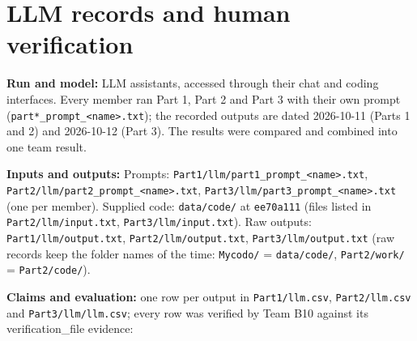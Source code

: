 \documentclass[11pt,a4paper]{article}
\newcommand{\field}[2]{\textbf{#1:} #2\par}
\begin{document}
\section{LLM records and human verification}
\field{Run and model}{LLM assistants, accessed through their chat and coding interfaces. Every member ran Part 1, Part 2 and Part 3 with their own prompt (\texttt{part*\_\allowbreak{}prompt\_\allowbreak{}\textless{}name\textgreater{}.\allowbreak{}txt}); the recorded outputs are dated 2026-10-11 (Parts 1 and 2) and 2026-10-12 (Part 3). The results were compared and combined into one team result.}
\field{Inputs and outputs}{Prompts: \texttt{Part1/\allowbreak{}llm/\allowbreak{}part1\_\allowbreak{}prompt\_\allowbreak{}\textless{}name\textgreater{}.\allowbreak{}txt}, \texttt{Part2/\allowbreak{}llm/\allowbreak{}part2\_\allowbreak{}prompt\_\allowbreak{}\textless{}name\textgreater{}.\allowbreak{}txt}, \texttt{Part3/\allowbreak{}llm/\allowbreak{}part3\_\allowbreak{}prompt\_\allowbreak{}\textless{}name\textgreater{}.\allowbreak{}txt} (one per member). Supplied code: \texttt{data/\allowbreak{}code/\allowbreak{}} at \texttt{ee70a111} (files listed in \texttt{Part2/\allowbreak{}llm/\allowbreak{}input.\allowbreak{}txt}, \texttt{Part3/\allowbreak{}llm/\allowbreak{}input.\allowbreak{}txt}). Raw outputs: \texttt{Part1/\allowbreak{}llm/\allowbreak{}output.\allowbreak{}txt}, \texttt{Part2/\allowbreak{}llm/\allowbreak{}output.\allowbreak{}txt}, \texttt{Part3/\allowbreak{}llm/\allowbreak{}output.\allowbreak{}txt} (raw records keep the folder names of the time: \texttt{Mycodo/\allowbreak{}} = \texttt{data/\allowbreak{}code/\allowbreak{}}, \texttt{Part2/\allowbreak{}work/\allowbreak{}} = \texttt{Part2/\allowbreak{}code/\allowbreak{}}).}
\field{Claims and evaluation}{one row per output in \texttt{Part1/\allowbreak{}llm.\allowbreak{}csv}, \texttt{Part2/\allowbreak{}llm.\allowbreak{}csv} and \texttt{Part3/\allowbreak{}llm/\allowbreak{}llm.\allowbreak{}csv}; every row was verified by Team B10 against its verification\_file evidence:}
\end{document}
